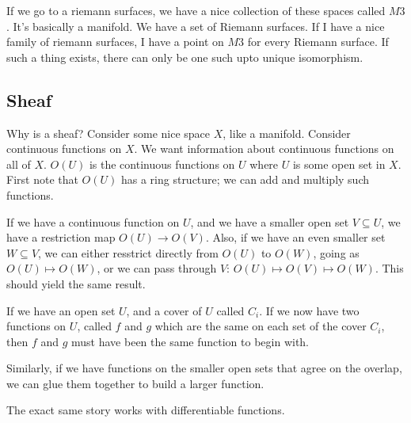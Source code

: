 \documentclass{book}
\theoremstyle{definition}
\begin{document}
If we go to a riemann surfaces, we have a nice collection of these spaces
called $M3$. It's basically a manifold. We have a set of Riemann surfaces.
If I have a nice family of riemann surfaces, I have a point on $M3$ for
every Riemann surface. If such a thing exists, there can only be one such
upto unique isomorphism.

\subsection{Sheaf}
Why is a sheaf? Consider some nice space $X$, like a manifold. Consider continuous
functions on $X$. We want information about continuous functions on all of $X$.
$O(U)$ is the continuous functions on $U$  where $U$ is some open set in $X$.
First note that $O(U)$ has a ring structure; we can add and multiply such functions.

If we have a continuous function on $U$, and we have a smaller open set $V \subseteq U$,
we have a restriction map $O(U) \rightarrow O(V)$. Also, if we have an even smaller
set $W \subseteq V$, we can either resstrict directly from $O(U)$ to $O(W)$, going
as $O(U) \mapsto O(W)$, or we can pass through $V$: $O(U) \mapsto O(V) \mapsto O(W)$. 
This should yield the same result.


If we have an open set $U$, and a cover of $U$ called ${C_i}$.  If we now have
two functions on $U$, called $f$ and $g$ which are the same on each set
of the cover $C_i$, then $f$ and $g$ must have been the same function to begin
with.

Similarly, if we have functions on the smaller open sets that agree on the overlap,
we can glue them together to build a larger function.


The exact same story works with differentiable functions.
\end{document}
